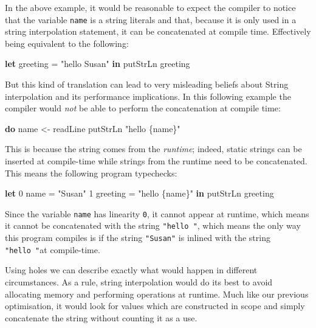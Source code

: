\documentclass[
]{article}
\newenvironment{Shaded}{}{}
\newcommand{\DecValTok}[1]{\textcolor[rgb]{0.25,0.63,0.44}{#1}}
\newcommand{\FunctionTok}[1]{\textcolor[rgb]{0.02,0.16,0.49}{#1}}
\newcommand{\KeywordTok}[1]{\textcolor[rgb]{0.00,0.44,0.13}{\textbf{#1}}}
\newcommand{\NormalTok}[1]{#1}
\newcommand{\OtherTok}[1]{\textcolor[rgb]{0.00,0.44,0.13}{#1}}
\newcommand{\StringTok}[1]{\textcolor[rgb]{0.25,0.44,0.63}{#1}}
\begin{document}
In the above example, it would be reasonable to expect the compiler to
notice that the variable \texttt{name} is a string literals and that,
because it is only used in a string interpolation statement, it can be
concatenated at compile time. Effectively being equivalent to the
following:

\begin{Shaded}
\begin{Highlighting}[]
\KeywordTok{let}\NormalTok{ greeting }\OtherTok{=} \StringTok{"hello Susan"} \KeywordTok{in} 
    \FunctionTok{putStrLn}\NormalTok{ greeting}
\end{Highlighting}
\end{Shaded}

But this kind of translation can lead to very misleading beliefs about
String interpolation and its performance implications. In this following
example the compiler would \emph{not} be able to perform the
concatenation at compile time:

\begin{Shaded}
\begin{Highlighting}[]
\KeywordTok{do}\NormalTok{ name }\OtherTok{\textless{}{-}}\NormalTok{ readLine}
   \FunctionTok{putStrLn} \StringTok{"hello \{name\}"}
\end{Highlighting}
\end{Shaded}

This is because the string comes from the \emph{runtime}; indeed, static
strings can be inserted at compile-time while strings from the runtime
need to be concatenated. This means the following program typechecks:

\begin{Shaded}
\begin{Highlighting}[]
\KeywordTok{let} \DecValTok{0}\NormalTok{ name }\OtherTok{=} \StringTok{"Susan"} 
    \DecValTok{1}\NormalTok{ greeting }\OtherTok{=} \StringTok{"hello \{name\}"} \KeywordTok{in}
    \FunctionTok{putStrLn}\NormalTok{ greeting}
\end{Highlighting}
\end{Shaded}

Since the variable \texttt{name} has linearity \texttt{0}, it cannot
appear at runtime, which means it cannot be concatenated with the string
\texttt{"hello\ "}, which means the only way this program compiles is if
the string \texttt{"Susan"} is inlined with the string
\texttt{"hello\ "}at compile-time.

Using holes we can describe exactly what would happen in different
circumstances. As a rule, string interpolation would do its best to
avoid allocating memory and performing operations at runtime. Much like
our previous optimisation, it would look for values which are
constructed in scope and simply concatenate the string without counting
it as a use.
\end{document}
